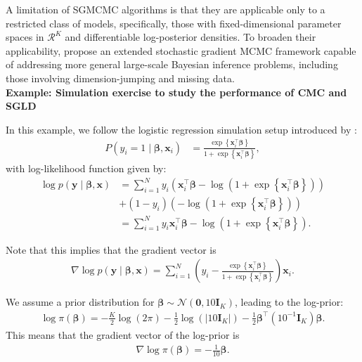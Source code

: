 A limitation of SGMCMC algorithms is that they are applicable only to a restricted class of models, specifically, those with fixed-dimensional parameter spaces in \( \mathcal{R}^K \) and differentiable log-posterior densities. To broaden their applicability, \cite{song2020extended} propose an extended stochastic gradient MCMC framework capable of addressing more general large-scale Bayesian inference problems, including those involving dimension-jumping and missing data.\\

\textbf{Example: Simulation exercise to study the performance of CMC and SGLD}

In this example, we follow the logistic regression simulation setup introduced by \cite{nemeth2021stochastic}:
\begin{align*}
	P(y_i = 1 \mid \boldsymbol{\beta}, \mathbf{x}_i) &= \frac{\exp\left\{\mathbf{x}_i^{\top} \boldsymbol{\beta}\right\}}{1 + \exp\left\{\mathbf{x}_i^{\top} \boldsymbol{\beta}\right\}},
\end{align*}
with log-likelihood function given by:
\begin{align*}
	\log p(\mathbf{y} \mid \boldsymbol{\beta}, \mathbf{x}) 
	&= \sum_{i=1}^N y_i \left( \mathbf{x}_i^{\top} \boldsymbol{\beta} - \log \left(1 + \exp\left\{\mathbf{x}_i^{\top} \boldsymbol{\beta}\right\} \right) \right)\\
	&+ (1 - y_i) \left( - \log \left(1 + \exp\left\{\mathbf{x}_i^{\top} \boldsymbol{\beta}\right\} \right) \right) \\
	&= \sum_{i=1}^N y_i \mathbf{x}_i^{\top} \boldsymbol{\beta} - \log \left(1 + \exp\left\{\mathbf{x}_i^{\top} \boldsymbol{\beta}\right\} \right).
\end{align*}

Note that this implies that the gradient vector is
\begin{align*}
	\nabla \log p(\mathbf{y} \mid \boldsymbol{\beta}, \mathbf{x}) = \sum_{i=1}^N \left(y_i - \frac{\exp\left\{\mathbf{x}_i^{\top} \boldsymbol{\beta}\right\}}{1+\exp\left\{\mathbf{x}_i^{\top} \boldsymbol{\beta}\right\}}\right)\mathbf{x}_i. 
\end{align*}

We assume a prior distribution for \( \boldsymbol{\beta} \sim \mathcal{N}(\mathbf{0}, 10 \mathbf{I}_K) \), leading to the log-prior:
\begin{align*}
	\log \pi(\boldsymbol{\beta}) = -\frac{K}{2} \log(2\pi) - \frac{1}{2} \log\left( \lvert 10 \mathbf{I}_K \rvert \right) - \frac{1}{2} \boldsymbol{\beta}^{\top} (10^{-1} \mathbf{I}_K) \boldsymbol{\beta}.
\end{align*}
This means that the gradient vector of the log-prior is
\begin{align*}
	\nabla \log \pi(\boldsymbol{\beta}) = -\frac{1}{10}\boldsymbol{\beta}. 
\end{align*}

